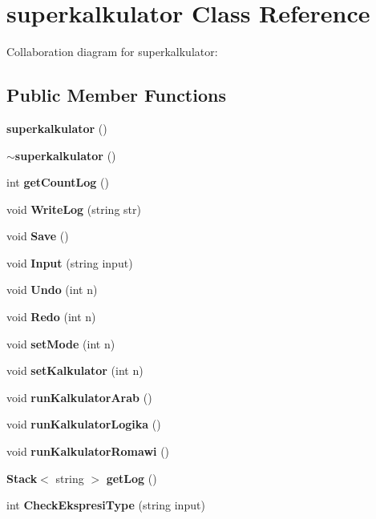 \section{superkalkulator Class Reference}
\label{classsuperkalkulator}
Collaboration diagram for superkalkulator:\subsection*{Public Member Functions}
\begin{CompactItemize}
\item 
{\bf superkalkulator} ()\label{classsuperkalkulator_0fee8ac5eb224c42468afa01baad748d}

\item 
{\bf $\sim$superkalkulator} ()\label{classsuperkalkulator_2aa376ad698b7b4f7f133b3998a07fff}

\item 
int {\bf get\-Count\-Log} ()\label{classsuperkalkulator_d8082e61fc70a9af6a208024f594afd9}

\item 
void {\bf Write\-Log} (string str)\label{classsuperkalkulator_a6386fb73a3f1a5f56603b094fb66c94}

\item 
void {\bf Save} ()\label{classsuperkalkulator_3b751a81a072f0baa5e85f7f43c27320}

\item 
void {\bf Input} (string input)\label{classsuperkalkulator_06d3c0bf8c4bf8e34c0b8faab70e6cda}

\item 
void {\bf Undo} (int n)\label{classsuperkalkulator_61b2d9f0ba56dac42e4458eade4602bc}

\item 
void {\bf Redo} (int n)\label{classsuperkalkulator_a039cd5a5c7e686e5e542a669a897ba3}

\item 
void {\bf set\-Mode} (int n)\label{classsuperkalkulator_303071f52879a615848823e8ad8c1549}

\item 
void {\bf set\-Kalkulator} (int n)\label{classsuperkalkulator_fc49bc2a8f03da410c24c01101144c2b}

\item 
void {\bf run\-Kalkulator\-Arab} ()\label{classsuperkalkulator_5130ad9cbe82a8fd21d36465f7cc9538}

\item 
void {\bf run\-Kalkulator\-Logika} ()\label{classsuperkalkulator_82a3e4e15373f23895e7496b3a71e077}

\item 
void {\bf run\-Kalkulator\-Romawi} ()\label{classsuperkalkulator_a35b0eb0639cbd097c981373dd64bff9}

\item 
{\bf Stack}$<$ string $>$ {\bf get\-Log} ()\label{classsuperkalkulator_d8d5f04f9c7dfee29b760afce7443fca}

\item 
int {\bf Check\-Ekspresi\-Type} (string input)\label{classsuperkalkulator_d6c80f4809273751b6fab73840783eb2}

\end{CompactItemize}


